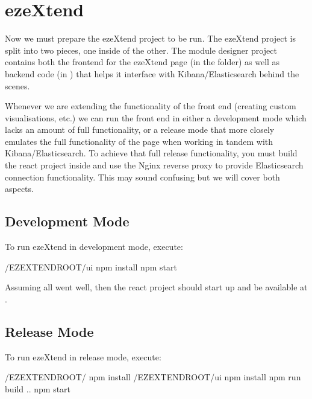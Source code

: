 \documentclass[letterpaper,10pt,english]{sphinxmanual}
\begin{document}
\section{ezeXtend}
\label{\detokenize{setup:ezextend}}
\sphinxAtStartPar
Now we must prepare the ezeXtend project to be run. The ezeXtend project is split into two pieces, one inside of the other. The module designer project contains both the frontend for the ezeXtend page (in the  folder) as well as backend code (in ) that helps it interface with Kibana/Elasticsearch behind the scenes.

\sphinxAtStartPar
Whenever we are extending the functionality of the front end (creating custom visualisations, etc.) we can run the front end in either a development mode which lacks an amount of full functionality, or a release mode that more closely emulates the full functionality of the page when working in tandem with Kibana/Elasticsearch. To achieve that full release functionality, you must build the  react project inside  and use the Nginx reverse proxy to provide Elasticsearch connection functionality. This may sound confusing but we will cover both aspects.


\subsection{Development Mode}
\label{\detokenize{setup:development-mode}}
\sphinxAtStartPar
To run ezeXtend in development mode, execute:

\begin{sphinxVerbatim}[commandchars=\\\{\}]
 /EZEXTEND\PYGZus{}ROOT/ui
npm install
npm start
\end{sphinxVerbatim}

\sphinxAtStartPar
Assuming all went well, then the react project should start up and be available at .


\subsection{Release Mode}
\label{\detokenize{setup:release-mode}}
\sphinxAtStartPar
To run ezeXtend in release mode, execute:

\begin{sphinxVerbatim}[commandchars=\\\{\}]
 /EZEXTEND\PYGZus{}ROOT/
npm install
 /EZEXTEND\PYGZus{}ROOT/ui
npm install
npm run build
 ..
npm start
\end{sphinxVerbatim}
\end{document}
